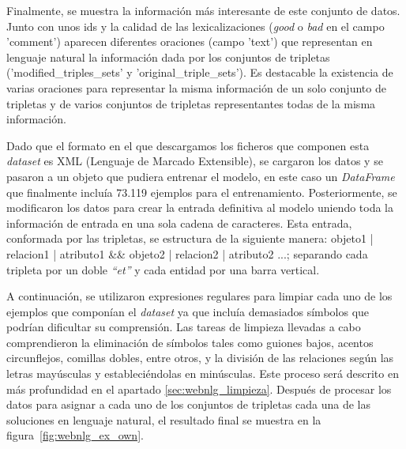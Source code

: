 Finalmente, se muestra la información más interesante de este conjunto de datos. Junto con unos ids y la calidad de las lexicalizaciones (\textit{good} o \textit{bad} en el campo 'comment') aparecen diferentes oraciones (campo 'text') que representan en lenguaje natural la información dada por los conjuntos de tripletas ('modified\_triples\_sets' y 'original\_triple\_sets'). Es destacable la existencia de varias oraciones para representar la misma información de un solo conjunto de tripletas y de varios conjuntos de tripletas representantes todas de la misma información. 


Dado que el formato en el que descargamos los ficheros que componen esta \textit{dataset} es XML (Lenguaje de Marcado Extensible), se cargaron los datos y se pasaron a un objeto que pudiera entrenar el modelo, en este caso un \textit{DataFrame} que finalmente incluía 73.119 ejemplos para el entrenamiento. Posteriormente, se modificaron los datos para crear la entrada definitiva al modelo uniendo toda la información de entrada en una sola cadena de caracteres. Esta entrada, conformada por las tripletas, se estructura de la siguiente manera: objeto1 | relacion1 | atributo1 \&\& objeto2 | relacion2 | atributo2 ...; separando cada tripleta por un doble \textit{``et''} y cada entidad por una barra vertical. 

A continuación, se utilizaron expresiones regulares para limpiar cada uno de los ejemplos que componían el \textit{dataset} ya que incluía demasiados símbolos que podrían dificultar su comprensión. Las tareas de limpieza llevadas a cabo comprendieron la eliminación de símbolos tales como guiones bajos, acentos circunflejos, comillas dobles, entre otros, y la división de las relaciones según las letras mayúsculas y estableciéndolas en minúsculas. Este proceso será descrito en más profundidad en el apartado \ref{sec:webnlg_limpieza}. Después de procesar los datos para asignar a cada uno de los conjuntos de tripletas cada una de las soluciones en lenguaje natural, el resultado final se muestra en la figura~\ref{fig:webnlg_ex_own}.


